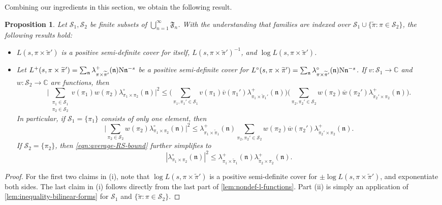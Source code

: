 \documentclass[11pt]{amsart}
\newtheorem{proposition}[theorem]{Proposition}
\theoremstyle{remark}
\numberwithin{equation}{section}
\newcommand{\n}{\mathfrak{n}}
\newcommand{\N}{\textnormal{N}}
\newcommand{\mS}{\mathcal{S}}
\renewcommand{\bar}{\overline}
\renewcommand{\tilde}{\widetilde}
\begin{document}
Combining our ingredients in this section, we obtain the following result.
\begin{proposition}
\label{prop:inequality-RS-covers}
Let $\mS_1, \mS_2$ be finite subsets of $\bigcup_{n=1}^{\infty}\mathfrak{F}_n$. With the understanding that families are indexed over $\mS_1 \cup \{\tilde\pi : \pi \in \mS_2\}$, the following results hold:
\begin{itemize}
    \item[$(i)$.] $L(s, \pi \times \tilde\pi')$ is a positive semi-definite cover for itself, $L(s, \pi \times \tilde\pi')^{-1}$, and $\log L(s, \pi \times \tilde\pi')$.
    \item[$(ii)$.] Let $L^+(s, \pi \times \tilde\pi') = \sum_\n \lambda^+_{\pi \times \tilde\pi'}(\n) \N\n^{-s}$ be a positive semi-definite cover for $L^\circ(s, \pi \times \tilde\pi') = \sum_\n \lambda^\circ_{\pi \times \tilde\pi'}(\n) \N\n^{-s}$.  If $v\colon \mS_1 \to \mathbb{C}$ and $w\colon \mS_2 \to \mathbb{C}$ are functions, then
\[
    \Bigg| \sum_{\substack{\pi_1 \in \mS_1 \\ \pi_2 \in \mS_2}} v(\pi_1) w(\pi_2) \lambda^\circ_{\pi_1 
    \times \pi_2}(\n) \Bigg|^2 \le \Bigg( \sum_{\pi_1, \pi_1' \in \mS_1} v(\pi_1) \bar v(\pi_1') \lambda^+_{\pi_1 \times \tilde\pi_1'}(\n) \Bigg) \Bigg( \sum_{\pi_2, \pi_2' \in \mS_2} w(\pi_2) \bar w(\pi_2') \lambda^+_{\tilde\pi_2' \times \pi_2}(\n) \Bigg).
\]
In particular, if $\mS_1 = \{\pi_1\}$ consists of only one element, then
\begin{equation}
\label{eqn:average-RS-bound}
    \Bigg| \sum_{\pi_2 \in \mS_2} w(\pi_2) \lambda^\circ_{\pi_1 
    \times \pi_2}(\n) \Bigg|^2 \le \lambda^+_{\pi_1 \times \tilde\pi_1}(\n) \sum_{\pi_2, \pi_2' \in \mS_2} w(\pi_2) \bar w(\pi_2') \lambda^+_{\tilde\pi_2' \times \pi_2}(\n).
\end{equation}
If $\mS_2 = \{\pi_2\}$, then \eqref{eqn:average-RS-bound} further simplifies to 
\begin{equation}
\label{eqn:pointwise-RS-bound}
    |\lambda^\circ_{\pi_1 \times \pi_2}(\n)|^2 \le \lambda^+_{\pi_1 \times \tilde\pi_1}(\n) \lambda^+_{\tilde\pi_2 \times \pi_2}(\n).
\end{equation}
\end{itemize}    
\end{proposition}

\begin{proof}
    For the first two claims in (i), note that $\log L(s, \pi \times \tilde\pi')$ is a positive semi-definite cover for $\pm \log L(s, \pi \times \tilde\pi')$, and exponentiate both sides. The last claim in (i) follows directly from the last part of \cref{lem:nondef-l-functions}. Part (ii) is simply an application of \cref{lem:inequality-bilinear-forms} for $\mS_1$ and $\{\tilde\pi : \pi \in \mS_2\}$.
\end{proof}
\end{document}
